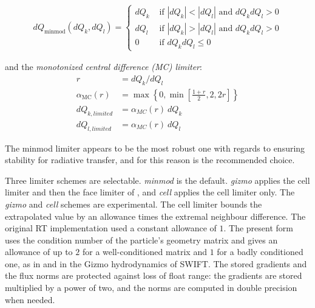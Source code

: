 \begin{align}
    dQ_{\text{minmod}}(dQ_k, dQ_l) =
    \begin{cases}
      dQ_k      & \text{ if } |dQ_k| < |dQ_l| \text{ and } dQ_k dQ_l > 0 \\
      dQ_l      & \text{ if } |dQ_k| > |dQ_l| \text{ and } dQ_k dQ_l > 0 \\
      0         & \text{ if }  dQ_k dQ_l \leq 0
    \end{cases} \label{eq:rt-minmod}
\end{align}

and the \emph{monotonized central difference (MC) limiter}:
\begin{align}
	r &= dQ_k / dQ_l \nonumber \\
	\alpha_{\text{MC}}(r) &= \max \left\{ 0, \min\left[\frac{1 + r}{2}, 2, 2r \right] \right\}
	\label{eq:rt-MC}\\
	dQ_{k, limited} &= \alpha_{MC}(r)\ dQ_k \nonumber\\
	dQ_{l, limited} &= \alpha_{MC}(r)\ dQ_l \nonumber
\end{align}


The minmod limiter appears to be the most robust one with regards to ensuring stability for
radiative transfer, and for this reason is the recommended choice.


Three limiter schemes are selectable. \emph{minmod} is the default. \emph{gizmo} applies the
cell limiter and then the face limiter of \citet{hopkinsGIZMONewClass2015}, and \emph{cell} applies the cell
limiter only. The \emph{gizmo} and \emph{cell} schemes are experimental. The cell limiter bounds
the extrapolated value by an allowance times the extremal neighbour difference. The original RT
implementation used a constant allowance of $1$. The present form uses the condition number of the
particle's geometry matrix and gives an allowance of up to $2$ for a well-conditioned matrix and
$1$ for a badly conditioned one, as in \citet{hopkinsGIZMONewClass2015} and in the Gizmo hydrodynamics of
SWIFT. The stored gradients and the flux norms are protected against loss of float range: the
gradients are stored multiplied by a power of two, and the norms are computed in double precision
when needed.

